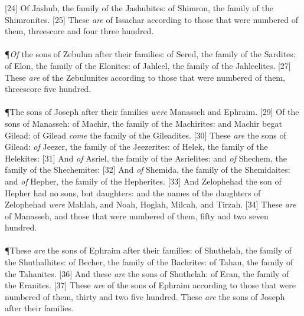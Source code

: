 [24] \textcolor[cmyk]{0.99998,1,0,0}{Of Jashub, the family of the Jashubites: of Shimron, the family of the Shimronites.}
[25] \textcolor[cmyk]{0.99998,1,0,0}{These \emph{are}  of Issachar according to those that were numbered of them, threescore and four  three hundred.}\\
\\
\P \textcolor[cmyk]{0.99998,1,0,0}{\emph{Of} the sons of Zebulun after their families: of Sered, the family of the Sardites: of Elon, the family of the Elonites: of Jahleel, the family of the Jahleelites.}
[27] \textcolor[cmyk]{0.99998,1,0,0}{These \emph{are}  of the Zebulunites according to those that were numbered of them, threescore  five hundred.}\\
\\
\P \textcolor[cmyk]{0.99998,1,0,0}{The sons of Joseph after their families \emph{were} Manasseh and Ephraim.}
[29] \textcolor[cmyk]{0.99998,1,0,0}{Of the sons of Manasseh: of Machir, the family of the Machirites: and Machir begat Gilead: of Gilead \emph{come} the family of the Gileadites.}
[30] \textcolor[cmyk]{0.99998,1,0,0}{These \emph{are} the sons of Gilead: \emph{of} Jeezer, the family of the Jeezerites: of Helek, the family of the Helekites:}
[31] \textcolor[cmyk]{0.99998,1,0,0}{And \emph{of} Asriel, the family of the Asrielites: and \emph{of} Shechem, the family of the Shechemites:}
[32] \textcolor[cmyk]{0.99998,1,0,0}{And \emph{of} Shemida, the family of the Shemidaites: and \emph{of} Hepher, the family of the Hepherites.}
[33] \textcolor[cmyk]{0.99998,1,0,0}{And Zelophehad the son of Hepher had no sons, but daughters: and the names of the daughters of Zelophehad \emph{were} Mahlah, and Noah, Hoglah, Milcah, and Tirzah.}
[34] \textcolor[cmyk]{0.99998,1,0,0}{These \emph{are}  of Manasseh, and those that were numbered of them, fifty and two  seven hundred.}\\
\\
\P \textcolor[cmyk]{0.99998,1,0,0}{These \emph{are} the sons of Ephraim after their families: of Shuthelah, the family of the Shuthalhites: of Becher, the family of the Bachrites: of Tahan, the family of the Tahanites.}
[36] \textcolor[cmyk]{0.99998,1,0,0}{And these \emph{are} the sons of Shuthelah: of Eran, the family of the Eranites.}
[37] \textcolor[cmyk]{0.99998,1,0,0}{These \emph{are}  of the sons of Ephraim according to those that were numbered of them, thirty and two  five hundred. These \emph{are} the sons of Joseph after their families.}\\
